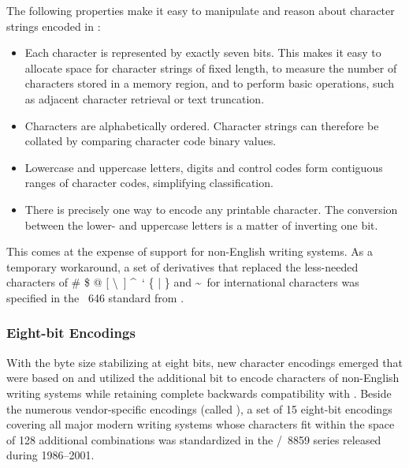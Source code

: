 \documentclass[
  a5paper,10pt,           %
  dvipsnames              %
]{book}
\begin{document}
The following properties make it easy to manipulate and reason about character
strings encoded in :
\begin{itemize}
  \item Each character is represented by exactly seven bits. This makes it easy
    to allocate space for character strings of fixed length, to measure the
    number of characters stored in a memory region, and to perform basic
    operations, such as adjacent character retrieval or text truncation.
  \item Characters are alphabetically ordered. Character strings can therefore
    be collated by comparing character code binary values.
  \item Lowercase and uppercase letters, digits and control codes form
    contiguous ranges of character codes, simplifying classification.
  \item There is precisely one way to encode any printable character. The
    conversion between the lower- and uppercase letters is a matter of
    inverting one bit.
\end{itemize}
This comes at the expense of support for non-English writing systems. As a
temporary workaround, a set of  derivatives that replaced the
less-needed characters of \# \$ @ [ \textbackslash\ ] \textasciicircum\ ` \{ |
\} and \textasciitilde\ for international characters was specified in the
~646 standard \cite{iso72} from \citeyear{iso72}.

\subsubsection{Eight-bit Encodings}
With the byte size stabilizing at eight bits, new character encodings emerged
that were based on  and utilized the additional bit to encode
characters of non-English writing systems while retaining complete backwards
compatibility with . Beside the numerous vendor-specific
encodings (called ), a set of 15 eight-bit encodings covering
all major modern writing systems whose characters fit within the space of 128
additional combinations was standardized in the
/~8859 series released during 1986--2001.

\end{document}
